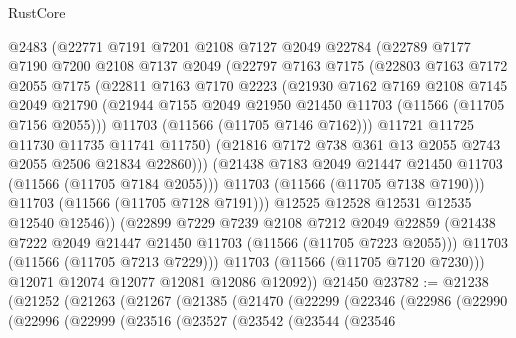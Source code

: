 \begin{lexlean}{RustCore}
\begin{coremodule}
              @2483
              (@22771
                @7191
                @7201
                @2108
                @7127
                @2049
                @22784
                (@22789
                  @7177
                  @7190
                  @7200
                  @2108
                  @7137
                  @2049
                  (@22797
                    @7163
                    @7175
                    (@22803
                      @7163
                      @7172
                      @2055
                      @7175
                      (@22811
                        @7163
                        @7170
                        @2223
                        (@21930
                          @7162
                          @7169
                          @2108
                          @7145
                          @2049
                          @21790
                          (@21944 @7155 @2049 @21950 @21450 @11703 (@11566 (@11705 @7156 @2055)))
                          @11703
                          (@11566 (@11705 @7146 @7162)))
                        @11721
                        @11725
                        @11730
                        @11735
                        @11741
                        @11750)
                      (@21816 @7172 @738 @361 @13 @2055 @2743 @2055 @2506 @21834 @22860)))
                  (@21438 @7183 @2049 @21447 @21450 @11703 (@11566 (@11705 @7184 @2055)))
                  @11703
                  (@11566 (@11705 @7138 @7190)))
                @11703
                (@11566 (@11705 @7128 @7191)))
              @12525
              @12528
              @12531
              @12535
              @12540
              @12546))
          (@22899
            @7229
            @7239
            @2108
            @7212
            @2049
            @22859
            (@21438 @7222 @2049 @21447 @21450 @11703 (@11566 (@11705 @7223 @2055)))
            @11703
            (@11566 (@11705 @7213 @7229)))
          @11703
          (@11566 (@11705 @7120 @7230)))
        @12071
        @12074
        @12077
        @12081
        @12086
        @12092))
    @21450
@23782 := @21238
    (@21252
      (@21263
        (@21267
          (@21385
            (@21470
              (@22299
                (@22346
                  (@22986
                    (@22990
                      (@22996
                        (@22999
                          (@23516
                            (@23527
                              (@23542
                                (@23544
                                  (@23546

\end{coremodule}
\end{lexlean}
